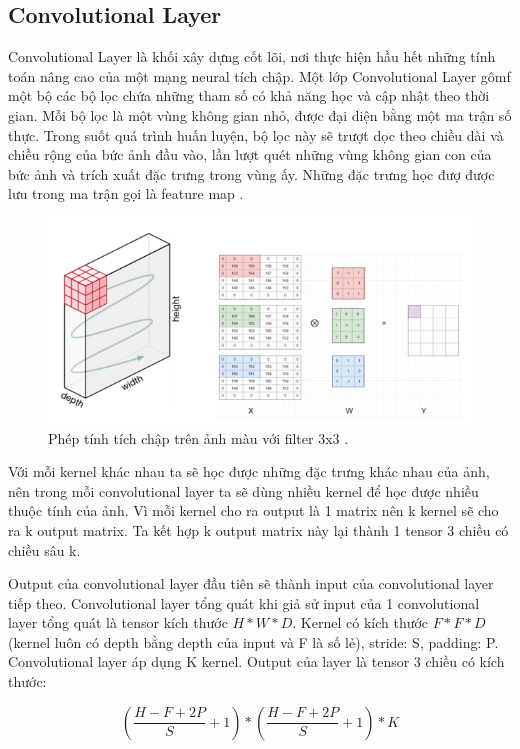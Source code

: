 \subsection{Convolutional Layer}
Convolutional Layer là khối xây dựng cốt lõi, nơi thực hiện hầu hết những tính toán nâng cao của một mạng neural tích chập. Một lớp Convolutional Layer gômf một bộ các bộ lọc chứa những tham số có khả năng học và cập nhật theo thời gian. Mỗi bộ lọc là một vùng không gian nhỏ, được đại diện bằng một ma trận số thực. Trong suốt quá trình huấn luyện, bộ lọc này sẽ trượt dọc theo chiều dài và chiều rộng của bức ảnh đầu vào, lần lượt quét 
 những vùng không gian con của bức ảnh và trích xuất đặc trưng trong vùng ấy. Những đặc trưng học đượ được lưu trong ma trận gọi là feature map \cite{ntt:2019}.\par
\begin{figure}[ht!]
\centerline{\includegraphics[scale=0.5]{images/neural6.png}}
\caption{Phép tính tích chập trên ảnh màu với filter 3x3 \cite{ntt:2019}.}
\label{fig:neural6}
\end{figure}
Với mỗi kernel khác nhau ta sẽ học được những đặc trưng khác nhau của ảnh, nên trong mỗi convolutional layer ta sẽ dùng nhiều kernel để học được nhiều thuộc tính của ảnh. Vì mỗi kernel cho ra output là 1 matrix nên k kernel sẽ cho ra k output matrix. Ta kết hợp k output matrix này lại thành 1 tensor 3 chiều có chiều sâu k.\par
Output của convolutional layer đầu tiên sẽ thành input của convolutional layer tiếp theo. Convolutional layer tổng quát khi giả sử input của 1 convolutional layer tổng quát là tensor kích thước $H * W * D$.  Kernel có kích thước $F * F * D$ (kernel luôn có depth bằng depth của input và F là số lẻ), stride: S, padding: P. Convolutional layer áp dụng K kernel. Output của layer là tensor 3 chiều có kích thước: \par
\begin{equation}
\left(\dfrac{H-F+2P}{S}+1\right)*\left(\dfrac{H-F+2P}{S}+1\right)* K
\end{equation}
